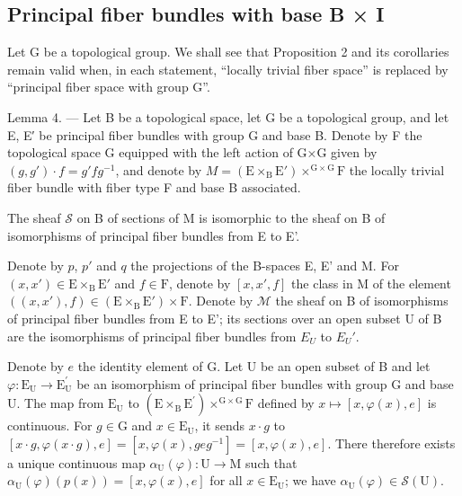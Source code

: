 \subsection{Principal fiber bundles with base B × I}

Let G be a topological group. We shall see that Proposition 2 and its corollaries remain valid when, in each statement, “locally trivial fiber space” is replaced by “principal fiber space with group G”.

Lemma 4. --- Let B be a topological space, let G be a topological group, and let E, E′ be principal fiber bundles with group G and base B. Denote by F the topological space G equipped with the left action of G×G given by \((g,g')\cdot f=g'fg^{-1}\), and denote by \(M = (\mathrm{E}\times_{\mathrm{B}}\mathrm{E}')\times^{\mathrm{G}\times\mathrm{G}}\mathrm{F}\) the locally trivial fiber bundle with fiber type F and base B associated.

The sheaf \(\mathcal{S}\) on B of sections of M is isomorphic to the sheaf on B of isomorphisms of principal fiber bundles from E to E'.

Denote by \(p\), \(p'\) and \(q\) the projections of the B-spaces E, E' and M. For \((x, x') \in \mathrm{E} \times_{\mathrm{B}} \mathrm{E}'\) and \(f \in \mathrm{F}\), denote by \([x, x', f]\) the class in M of the element \(((x, x'), f) \in (\mathrm{E} \times_{\mathrm{B}} \mathrm{E}') \times \mathrm{F}\). Denote by \(\mathcal{M}\) the sheaf on B of isomorphisms of principal fiber bundles from E to E'; its sections over an open subset U of B are the isomorphisms of principal fiber bundles from \(E_{U}\) to \(E_{U}'\).

Denote by \(e\) the identity element of G. Let U be an open subset of B and let \(\varphi\colon\mathrm{E}_{\mathrm{U}}\to\mathrm{E}_{\mathrm{U}}^{\prime}\) be an isomorphism of principal fiber bundles with group G and base U. The map from \(\mathrm{E}_{\mathrm{U}}\) to \((\mathrm{E}\times_{\mathrm{B}}\mathrm{E}^{\prime})\times^{\mathrm{G}\times\mathrm{G}}\mathrm{F}\) defined by \(x\mapsto[x,\varphi(x),e]\) is continuous. For \(g\in\mathrm{G}\) and \(x\in\mathrm{E}_{\mathrm{U}}\), it sends \(x\cdot g\) to \([x\cdot g,\varphi(x\cdot g),e]=[x,\varphi(x),geg^{-1}]=[x,\varphi(x),e]\). There therefore exists a unique continuous map \(\alpha_{\mathrm{U}}(\varphi)\colon\mathrm{U}\to\mathrm{M}\) such that \(\alpha_{\mathrm{U}}(\varphi)(p(x))=[x,\varphi(x),e]\) for all \(x\in\mathrm{E}_{\mathrm{U}}\); we have \(\alpha_{\mathrm{U}}(\varphi)\in\mathcal{S}(\mathrm{U})\).

